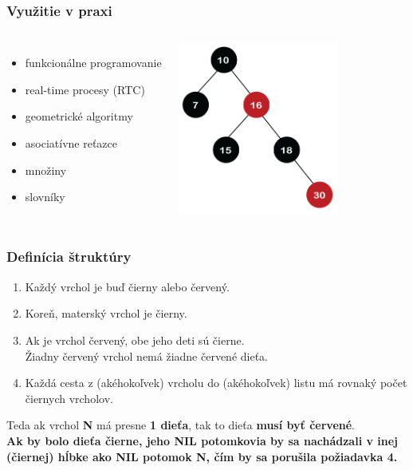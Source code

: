 \documentclass{beamer}
\begin{document}
    \begin{frame}
        \frametitle{Využitie v praxi}
        \begin{columns}
            \begin{itemize}
                \item funkcionálne programovanie
                \item real-time procesy (RTC)
                \item geometrické algoritmy
                \vspace{20pt}
                \item asociatívne reťazce
                \item množiny
                \item slovníky
            \end{itemize}
            \includegraphics[width=150pt]{pic/rbt17}
        \end{columns}
    \end{frame}

    \begin{frame}
        \frametitle{Definícia štruktúry}
        \begin{enumerate}
            \item Každý vrchol je buď čierny alebo červený.
            \item Koreň, materský vrchol je čierny.
            \item Ak je vrchol červený, obe jeho deti sú čierne.\\
            Žiadny červený vrchol nemá žiadne červené dieťa.
            \item Každá cesta z (akéhokoľvek) vrcholu do (akéhokoľvek) listu má rovnaký počet čiernych vrcholov.
        \end{enumerate}
        \vspace{20pt}
        Teda ak vrchol \textbf{N} má presne \textbf{1 dieťa}, tak to dieťa \textbf{musí byť červené}. \\
        \vspace{5pt}
        {\footnotesize{\textbf{Ak by bolo dieťa čierne, jeho NIL potomkovia by sa nachádzali v inej (čiernej) hĺbke ako NIL potomok N, čím by sa porušila požiadavka 4.}}}

        \vspace{15pt}
    \end{frame}
\end{document}
